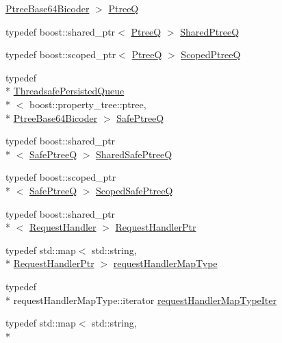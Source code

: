 \begin{DoxyCompactItemize}
\hyperlink{classkisscpp_1_1_ptree_base64_bicoder}{Ptree\-Base64\-Bicoder} $>$ \hyperlink{namespacekisscpp_af1d6724570f46ac378171bd45ddf6903}{Ptree\-Q}
\item 
typedef boost\-::shared\-\_\-ptr$<$ \hyperlink{namespacekisscpp_af1d6724570f46ac378171bd45ddf6903}{Ptree\-Q} $>$ \hyperlink{namespacekisscpp_aecf9f29bb4c41e0d4dbc74731a3020cd}{Shared\-Ptree\-Q}
\item 
typedef boost\-::scoped\-\_\-ptr$<$ \hyperlink{namespacekisscpp_af1d6724570f46ac378171bd45ddf6903}{Ptree\-Q} $>$ \hyperlink{namespacekisscpp_a64a7093fe1bdc3f323b469e800eebc7f}{Scoped\-Ptree\-Q}
\item 
typedef \\*
\hyperlink{classkisscpp_1_1_threadsafe_persisted_queue}{Threadsafe\-Persisted\-Queue}\\*
$<$ boost\-::property\-\_\-tree\-::ptree, \\*
\hyperlink{classkisscpp_1_1_ptree_base64_bicoder}{Ptree\-Base64\-Bicoder} $>$ \hyperlink{namespacekisscpp_ac48ab954f4898861f383b80e857e17cc}{Safe\-Ptree\-Q}
\item 
typedef boost\-::shared\-\_\-ptr\\*
$<$ \hyperlink{namespacekisscpp_ac48ab954f4898861f383b80e857e17cc}{Safe\-Ptree\-Q} $>$ \hyperlink{namespacekisscpp_ae95e969e7f5dfd1f36842ac9aa25c7ea}{Shared\-Safe\-Ptree\-Q}
\item 
typedef boost\-::scoped\-\_\-ptr\\*
$<$ \hyperlink{namespacekisscpp_ac48ab954f4898861f383b80e857e17cc}{Safe\-Ptree\-Q} $>$ \hyperlink{namespacekisscpp_a20653e6629a85affc6a1b8529e0a8da0}{Scoped\-Safe\-Ptree\-Q}
\item 
typedef boost\-::shared\-\_\-ptr\\*
$<$ \hyperlink{classkisscpp_1_1_request_handler}{Request\-Handler} $>$ \hyperlink{namespacekisscpp_a21e40edcd4f1a3c7c1cc0015b576c8e5}{Request\-Handler\-Ptr}
\item 
typedef std\-::map$<$ std\-::string, \\*
\hyperlink{namespacekisscpp_a21e40edcd4f1a3c7c1cc0015b576c8e5}{Request\-Handler\-Ptr} $>$ \hyperlink{namespacekisscpp_acaaba8d5ee3dd772dbf008749245c357}{request\-Handler\-Map\-Type}
\item 
typedef \\*
request\-Handler\-Map\-Type\-::iterator \hyperlink{namespacekisscpp_acb02d872f8089cccfccea0cbf2191a76}{request\-Handler\-Map\-Type\-Iter}
\item 
typedef std\-::map$<$ std\-::string, \\*

\end{DoxyCompactItemize}
